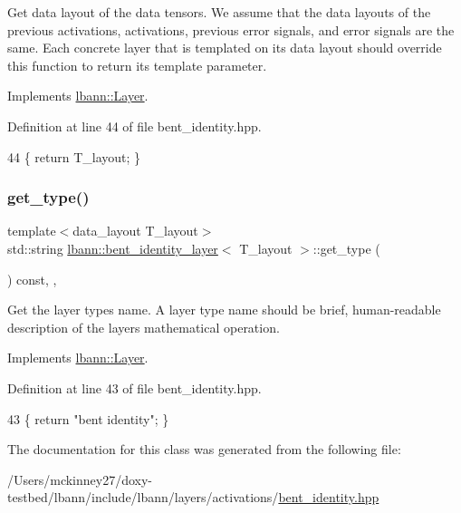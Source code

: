 Get data layout of the data tensors. We assume that the data layouts of the previous activations, activations, previous error signals, and error signals are the same. Each concrete layer that is templated on its data layout should override this function to return its template parameter. 

Implements \hyperlink{classlbann_1_1Layer_a5dfb66e81fc085997402a5e2241316bd}{lbann\+::\+Layer}.



Definition at line 44 of file bent\+\_\+identity.\+hpp.


\begin{DoxyCode}
44 \{ \textcolor{keywordflow}{return} T\_layout; \}
\end{DoxyCode}
\mbox{\label{classlbann_1_1bent__identity__layer_aaecb80232b00be688db24c235c6de074}} 
\subsubsection{\texorpdfstring{get\+\_\+type()}{get\_type()}}
{\footnotesize\ttfamily template$<$data\+\_\+layout T\+\_\+layout$>$ \\
std\+::string \hyperlink{classlbann_1_1bent__identity__layer}{lbann\+::bent\+\_\+identity\+\_\+layer}$<$ T\+\_\+layout $>$\+::get\+\_\+type (\begin{DoxyParamCaption}{ }\end{DoxyParamCaption}) const\hspace{0.3cm}{\ttfamily [inline]}, {\ttfamily [override]}, {\ttfamily [virtual]}}

Get the layer type\textquotesingle{}s name. A layer type name should be brief, human-\/readable description of the layer\textquotesingle{}s mathematical operation. 

Implements \hyperlink{classlbann_1_1Layer_a0fa0ea9160b490c151c0a17fde4f7239}{lbann\+::\+Layer}.



Definition at line 43 of file bent\+\_\+identity.\+hpp.


\begin{DoxyCode}
43 \{ \textcolor{keywordflow}{return} \textcolor{stringliteral}{"bent identity"}; \}
\end{DoxyCode}


The documentation for this class was generated from the following file\+:\begin{DoxyCompactItemize}
\item 
/\+Users/mckinney27/doxy-\/testbed/lbann/include/lbann/layers/activations/\hyperlink{bent__identity_8hpp}{bent\+\_\+identity.\+hpp}\end{DoxyCompactItemize}
